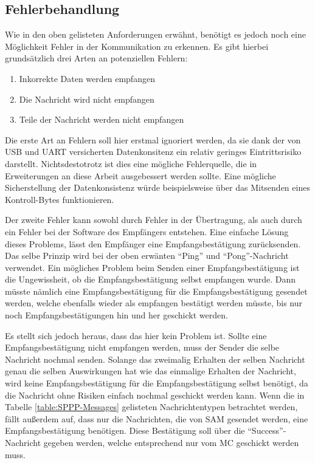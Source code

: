 \subsection{Fehlerbehandlung} \label{SPPP-Error-Handling}

Wie in den oben gelisteten Anforderungen erwähnt, benötigt es jedoch noch eine Möglichkeit Fehler in der Kommunikation zu erkennen.
Es gibt hierbei grundsätzlich drei Arten an potenziellen Fehlern:

\begin{enumerate}
    \item Inkorrekte Daten werden empfangen
    \item Die Nachricht wird nicht empfangen
    \item Teile der Nachricht werden nicht empfangen
\end{enumerate}

Die erste Art an Fehlern soll hier erstmal ignoriert werden, da sie dank der von USB und \ac{UART} versicherten Datenkonsitenz ein relativ geringes Eintrittsrisiko darstellt.
Nichtsdestotrotz ist dies eine mögliche Fehlerquelle, die in Erweiterungen an diese Arbeit ausgebessert werden sollte.
Eine mögliche Sicherstellung der Datenkonsistenz würde beispielsweise über das Mitsenden eines Kontroll-Bytes funktionieren.

Der zweite Fehler kann sowohl durch Fehler in der Übertragung, als auch durch ein Fehler bei der Software des Empfängers entstehen.
Eine einfache Lösung dieses Problems, lässt den Empfänger eine Empfangsbestätigung zurücksenden.
Das selbe Prinzip wird bei der oben erwänten \enquote{Ping} und \enquote{Pong}-Nachricht verwendet.
Ein mögliches Problem beim Senden einer Empfangsbestätigung ist die Ungewissheit, ob die Empfangsbestätigung selbst empfangen wurde.
Dann müsste nämlich eine Empfangsbestätigung für die Empfangsbestätigung gesendet werden, welche ebenfalls wieder als empfangen bestätigt werden müsste, bis nur noch Empfangsbestätigungen hin und her geschickt werden.

Es stellt sich jedoch heraus, dass das hier kein Problem ist.
Sollte eine Empfangsbestätigung nicht empfangen werden, muss der Sender die selbe Nachricht nochmal senden.
Solange das zweimalig Erhalten der selben Nachricht genau die selben Auswirkungen hat wie das einmalige Erhalten der Nachricht, wird keine Empfangsbestätigung für die Empfangsbestätigung selbst benötigt, da die Nachricht ohne Risiken einfach nochmal geschickt werden kann.
Wenn die in Tabelle \ref{table:SPPP-Messages} gelisteten Nachrichtentypen betrachtet werden, fällt außerdem auf, dass nur die Nachrichten, die von \ac{SAM} gesendet werden, eine Empfangsbestätigung benötigen.
Diese Bestätigung soll über die \enquote{Success}-Nachricht gegeben werden, welche entsprechend nur vom \ac{MC} geschickt werden muss.

